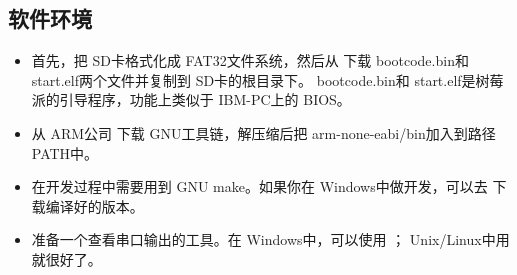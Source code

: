 \documentclass[main.tex]{subfiles}
\begin{document}
\begin{CJK*}{UTF8}{song}
\subsection{软件环境}
\begin{itemize}
\item 首先，把 SD卡格式化成 FAT32文件系统，然后从 下载 bootcode.bin和 start.elf两个文件并复制到 SD卡的根目录下。 boot\-code.bin和 start.elf是树莓派的引导程序，功能上类似于 IBM-PC上的 BIOS。
\item 从 ARM公司 下载 GNU工具链，解压缩后把 arm-\-none-\-eabi/bin加入到路径 PATH中。
\item 在开发过程中需要用到 GNU make。如果你在 Windows中做开发，可以去 下载编译好的版本。
\item 准备一个查看串口输出的工具。在 Windows中，可以使用 ； Unix\-/\-Linux中用 就很好了。

\end{itemize}

\clearpage
\ifxetex\else\end{CJK*}\fi
\end{document}
